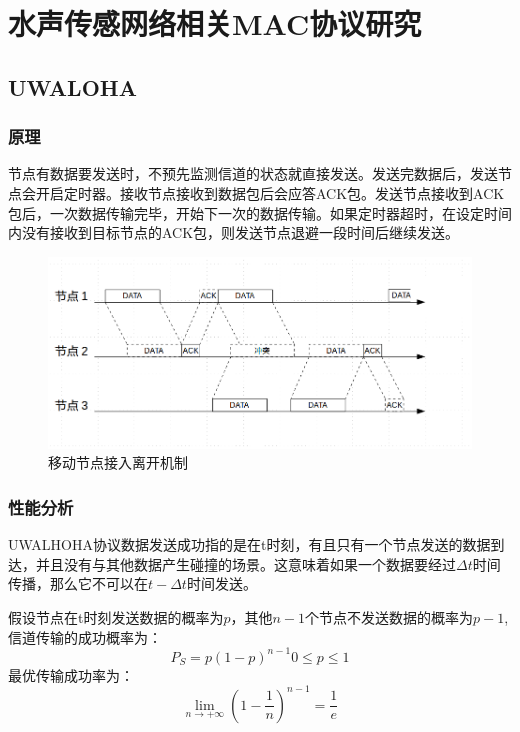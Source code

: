 \chapter{水声传感网络相关MAC协议研究 }
\section{UWALOHA}
\subsection{原理}
节点有数据要发送时，不预先监测信道的状态就直接发送。发送完数据后，发送节点会开启定时器。接收节点接收到数据包后会应答ACK包。发送节点接收到ACK包后，一次数据传输完毕，开始下一次的数据传输。如果定时器超时，在设定时间内没有接收到目标节点的ACK包，则发送节点退避一段时间后继续发送。

\begin{figure}[ht]
	\centering
	\includegraphics[scale=0.4]{figures/aloha.png}
	\caption{
		移动节点接入离开机制
	}
	\label{fig:example}
\end{figure}

\subsection{性能分析}
\cite{Analysis of Aloha Protocols for Underwater Acoustic Sensor Networks}
UWALHOHA协议数据发送成功指的是在t时刻，有且只有一个节点发送的数据到达，并且没有与其他数据产生碰撞的场景。这意味着如果一个数据要经过$\Delta t$时间传播，那么它不可以在$t-\Delta t$时间发送。

假设节点在t时刻发送数据的概率为$p$，其他$n-1$个节点不发送数据的概率为$p-1$,信道传输的成功概率为：
\begin{equation}
P_S=p(1-p)^{n-1}   0\le p\le 1
\end{equation}
最优传输成功率为：
\begin{equation}
\lim\limits_{n\to+\infty} (1-\frac{1}{n})^{n-1}=\frac{1}{e}
\end{equation}

